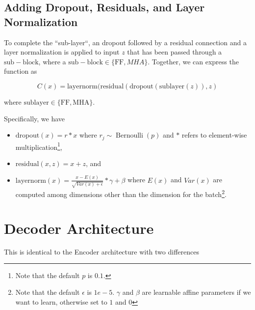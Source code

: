 \subsection{Adding Dropout, Residuals, and Layer Normalization}




To complete the ``sub-layer``, an dropout followed by a residual connection and a layer normalization is applied to input $z$ that has been passed through a $\mathrm{sub-block}$, where a $\mathrm{sub-block} \in \{\mathrm{FF}, MHA\}$. Together, we can express the function as

\begin{equation}
C(x) = \mathrm{layernorm}(\mathrm{residual}(\mathrm{dropout}(\mathrm{sublayer}(z)), z)
\end{equation}

where $\mathrm{sublayer} \in \{\mathrm{FF}, \mathrm{MHA}\}$.


Specifically, we have
\begin{itemize}
    \item $\mathrm{dropout}(x) = r * x$ where $ r_j \sim \operatorname{Bernoulli}(p)$ and $*$ refers to element-wise multiplication\footnote{Note that the default $p$ is $0.1$.},
    \item $\mathrm{residual}(x, z) = x + z$, and 
    \item $\mathrm{layernorm}(x) = \frac{x-E(x)}{\sqrt{Var(x)+\epsilon}}*\gamma + \beta$ where $E(x)$ and $Var(x)$ are computed among dimensions other than the dimension for the batch\footnote{Note that the default $\epsilon$ is $1e-5$. $\gamma$ and $\beta$ are learnable affine parameters if we want to learn, otherwise set to $1$ and $0$}.
\end{itemize}


\section{Decoder Architecture}\label{sec:dec}

This is identical to the Encoder architecture with two differences

